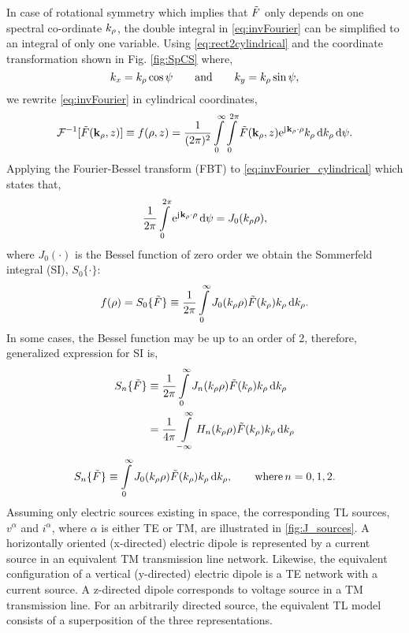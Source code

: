 \documentclass[12pt]{article}
\begin{document}
In case of rotational symmetry which implies that $\tilde{F}$ only depends on one spectral co-ordinate $k_{\rho}$, the double integral in \eqref{eq:invFourier} can be simplified to an integral of only one variable. Using  \eqref{eq:rect2cylindrical} and the coordinate transformation shown in Fig. \ref{fig:SpCS} where,
%
\begin{equation}
    k_x = k_{\p} \cos \psi \qquad \text{and} \qquad
    k_y = k_{\p} \sin \psi,
  \label{eq:cylindricaltransformation}%
\end{equation}
we rewrite \eqref{eq:invFourier} in cylindrical coordinates,
%
\begin{equation}
  \mathcal{F}^{-1} [\tilde{F}(\mathbf{k}_{\rho},z)] \equiv f(\mathbf{\rho},z) = \frac{1}{(2\pi)^2} \int\limits_0^{\infty} \int\limits_0^{2\pi}
  \tilde{F}(\mathbf{k}_{\rho},z) \mathrm{e}^{\mathrm{j}\mkern1mu \mathbf{k}_{\rho} \cdot \mathbf{\rho}} k_{\rho} \mathop{}\!\mathrm{d}{k_{\rho}} \mathop{}\!\mathrm{d}{\psi}.
  \label{eq:invFourier_cylindrical}
\end{equation}
%
Applying the Fourier-Bessel transform (FBT) to \eqref{eq:invFourier_cylindrical} which states that,
\begin{equation}
  \frac{1}{2\pi}\int\limits_0^{2\pi}
  \mathrm{e}^{\mathrm{j}\mkern1mu \mathbf{k}_{\rho} \cdot \mathbf{\rho}} \mathop{}\!\mathrm{d}{\psi} = J_0(k_{\rho}\rho),
  \label{eq:hankel_transofrm}
\end{equation}
%
where $J_0(\cdot)$ is the Bessel function of zero order
we obtain the Sommerfeld integral (SI), $S_0\{\cdot\}$:
%
\begin{equation}
  f(\rho) = S_0\{\tilde{F}\} \equiv \frac{1}{2\pi}\int\limits_0^{\infty} J_0(k_{\rho}\rho)  \tilde{F}(k_{\rho}) k_{\rho} \mathop{}\!\mathrm{d}{k_{\rho}}.
  \label{eq:sommerfeld_integral}
\end{equation}
%
In some cases, the Bessel function may be up to an order of 2, therefore, generalized expression for SI is,
%
\begin{equation}
  \begin{split}
    S_n\{\ti{F}\} \equiv{}& \frac{1}{2\pi}\int\limits_0^{\inf} J_n(k_{\p}\p)  \ti{F}(k_{\p}) k_{\p} \diff{k_{\p}}\\
    ={}& \frac{1}{4\pi}\int\limits_{-\inf}^{\inf} H_n(k_{\p}\p)  \ti{F}(k_{\p}) k_{\p} \diff{k_{\p}}
  \end{split}
  \label{eq:dFT_ET}%
\end{equation}
%
\begin{equation}
  S_n\{\tilde{F}\} \equiv \int\limits_0^{\infty} J_0(k_{\rho}\rho)  \tilde{F}(k_{\rho}) k_{\rho} \mathop{}\!\mathrm{d}{k_{\rho}}, \qquad \text{where} \, n = 0,1,2.
  \label{eq:generalized_SI}
\end{equation}
%
Assuming only electric sources existing in space, the corresponding TL sources, $v^{\alpha}$ and $i^{\alpha}$, where $\alpha$ is either TE or TM, are illustrated in \ref{fig:J_sources}. A horizontally oriented (x-directed) electric dipole is represented by a current source in an equivalent TM transmission line network. Likewise, the equivalent configuration of a vertical (y-directed) electric dipole is a TE network with a current source. A z-directed dipole corresponds to voltage source in a TM transmission line. For an arbitrarily directed source, the equivalent TL model consists of a superposition of the three representations.
%






\clearpage %
% 


\end{document}
